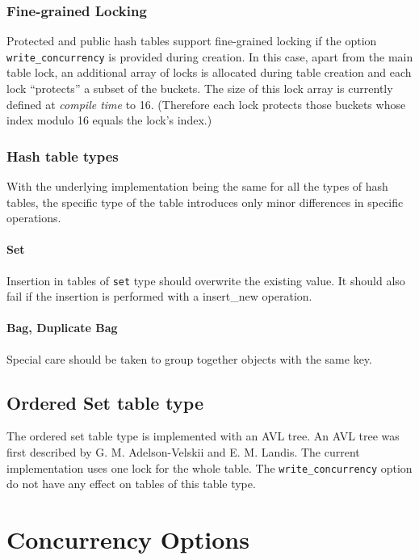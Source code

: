 \documentclass[aps,pre,preprint,nofootinbib]{revtex4}
\begin{document}
\subsubsection{Fine-grained Locking}

Protected and public hash tables support fine-grained locking if the option \verb|write_concurrency| is provided during creation.
In this case, apart from the main table lock, an additional array of locks is allocated during table creation and each lock ``protects'' a subset of the buckets.
The size of this lock array is currently defined at \emph{compile time} to 16.
(Therefore each lock protects those buckets whose index modulo 16 equals the lock's index.)


\subsubsection{Hash table types}     %

With the underlying implementation being the same for all the types of hash tables, the specific type of the table introduces only minor differences in specific operations.

\paragraph{Set}

Insertion in tables of \verb|set| type should overwrite the existing value.
It should also fail if the insertion is performed with a insert\_new operation.

\paragraph{Bag, Duplicate Bag}

Special care should be taken to group together objects with the same key.

\subsection{Ordered Set table type}

The ordered set table type is implemented with an AVL tree.
An AVL tree was first described by G. M. Adelson-Velskii and E. M. Landis.
The current implementation uses one lock for the whole table.
The \verb|write_concurrency| option do not have any effect on tables of this table type.

\section{Concurrency Options} \label{sec:concurrency_options}
\end{document}
